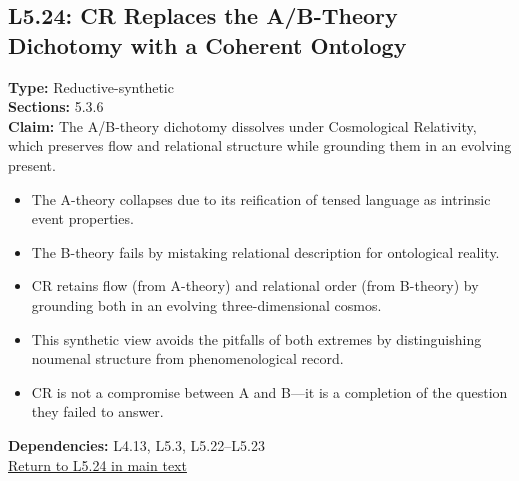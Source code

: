\documentclass[12pt]{book}
\newcommand{\returnlink}[1]{\hyperref[logic:#1]{Return to #1 in main text}\xspace}
\begin{document}
\subsection*{L5.24: CR Replaces the A/B-Theory Dichotomy with a Coherent Ontology}
\label{appendix:L5.24}
\textbf{Type:} Reductive-synthetic \\
\textbf{Sections:} 5.3.6 \\
\textbf{Claim:} The A/B-theory dichotomy dissolves under Cosmological Relativity, which preserves flow and relational structure while grounding them in an evolving present.
\begin{itemize}
  \item The A-theory collapses due to its reification of tensed language as intrinsic event properties.
  \item The B-theory fails by mistaking relational description for ontological reality.
  \item CR retains flow (from A-theory) and relational order (from B-theory) by grounding both in an evolving three-dimensional cosmos.
  \item This synthetic view avoids the pitfalls of both extremes by distinguishing noumenal structure from phenomenological record.
  \item CR is not a compromise between A and B---it is a completion of the question they failed to answer.
\end{itemize}
\textbf{Dependencies:} L4.13, L5.3, L5.22–L5.23 \\
\returnlink{L5.24}
\end{document}
